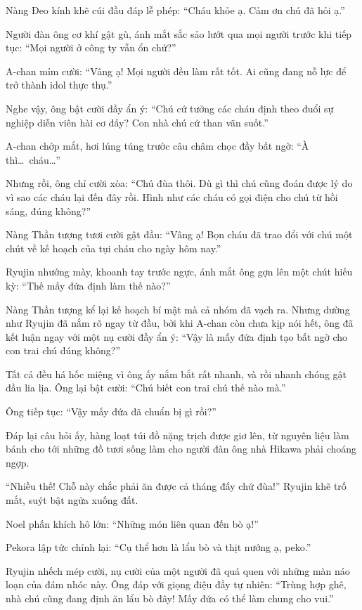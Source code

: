 \documentclass[../main.tex]{subfiles}
\begin{document}
Nàng Đeo kính khẽ cúi đầu đáp lễ phép: ``Cháu khỏe ạ. Cảm ơn chú đã hỏi ạ.''

Người đàn ông cơ khí gật gù, ánh mắt sắc sảo lướt qua mọi người trước khi tiếp tục: ``Mọi người ở công ty vẫn ổn chứ?''

A-chan mỉm cười: ``Vâng ạ! Mọi người đều làm rất tốt. Ai cũng đang nỗ lực để trở thành idol thực thụ.''

Nghe vậy, ông bật cười đầy ẩn ý: ``Chú cứ tưởng các cháu định theo đuổi sự nghiệp diễn viên hài cơ đấy? Con nhà chú cứ than vãn suốt.''

A-chan chớp mắt, hơi lúng túng trước câu châm chọc đầy bất ngờ: ``À thì\dots\ cháu\dots''

Nhưng rồi, ông chỉ cười xòa: ``Chú đùa thôi. Dù gì thì chú cũng đoán được lý do vì sao các cháu lại đến đây rồi. Hình như các cháu có gọi điện cho chú từ hồi sáng, đúng không?''

Nàng Thần tượng tươi cười gật đầu: ``Vâng ạ! Bọn cháu đã trao đổi với chú một chút về kế hoạch của tụi cháu cho ngày hôm nay.''

Ryujin nhướng mày, khoanh tay trước ngực, ánh mắt ông gợn lên một chút hiếu kỳ: ``Thế mấy đứa định làm thế nào?''

Nàng Thần tượng kể lại kế hoạch bí mật mà cả nhóm đã vạch ra. Nhưng dường như Ryujin đã nắm rõ ngay từ đầu, bởi khi A-chan còn chưa kịp nói hết, ông đã kết luận ngay với một nụ cười đầy ẩn ý: ``Vậy là mấy đứa định tạo bất ngờ cho con trai chú đúng không?''

Tất cả đều há hốc miệng vì ông ấy nắm bắt rất nhanh, và rồi nhanh chóng gật đầu lia lịa. Ông lại bật cười: ``Chú biết con trai chú thế nào mà.''

Ông tiếp tục: ``Vậy mấy đứa đã chuẩn bị gì rồi?''

Đáp lại câu hỏi ấy, hàng loạt túi đồ nặng trịch được giơ lên, từ nguyên liệu làm bánh cho tới những đồ tươi sống làm cho người đàn ông nhà Hikawa phải choáng ngợp.

``Nhiều thế! Chỗ này chắc phải ăn được cả tháng đấy chứ đùa!'' Ryujin khẽ trố mắt, suýt bật ngửa xuống đất.

Noel phấn khích hô lớn: ``Những món liên quan đến bò ạ!''

Pekora lập tức chỉnh lại: ``Cụ thể hơn là lẩu bò và thịt nướng ạ, peko.''

Ryujin nhếch mép cười, nụ cười của một người đã quá quen với những màn náo loạn của đám nhóc này. Ông đáp với giọng điệu đầy tự nhiên: ``Trùng hợp ghê, nhà chú cũng đang định ăn lẩu bò đây! Mấy đứa có thể làm chung cho vui.''
\end{document}
